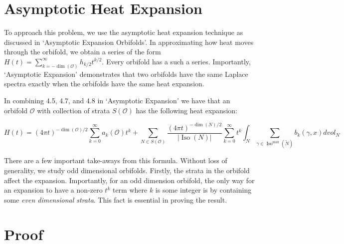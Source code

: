 \documentclass{article}[12pt]
\theoremstyle{definition}
\newcommand{\myabs}[1]{\vert#1\vert}
\newcommand{\orb}{\mathcal{O}}
\DeclareMathOperator{\iso}{Iso}
\begin{document}

\section{Asymptotic Heat Expansion}
To approach this problem, we use the asymptotic heat expansion technique as
discussed in `Asymptotic Expansion Orbifolds'\cite{DGGW}. In approximating
how heat moves through the orbifold, we obtain
a series of the form $H(t) = \sum_{k=-\dim(\orb)}^{\infty} h_{k/2}
t^{k/2}$. Every orbifold has a such a series. 
Importantly, `Asymptotic Expansion' demonstrates that two orbifolds
have the same Laplace spectra exactly when the orbifolds have the same heat
expansion.

In combining 4.5, 4.7, and 4.8 in `Asymptotic Expansion' we have
that an orbifold $\orb$ with collection of strata $S(\orb)$ has the
following heat expansion:

\begin{equation}
    H(t) = {(4\pi t)}^{-\dim(\mathcal{O})/2}\sum_{k=0}^{\infty}a_k(\mathcal{O})t^k
            +\sum_{N \in S(\mathcal{O})}\frac{{(4\pi t)}^{-\dim(N)/2}}{\myabs{\iso(N)}}\sum_{k=0}^{\infty}t^k\int_{N} \sum_{\gamma \in \iso^{\max}(\widetilde{N})}b_k(\gamma,x) dvol_N
            \label{eq:H(t)}
\end{equation}

There are a few important take-aways from this formula. 
Without loss of generality, we study odd dimensional orbifolds.
Firstly, the strata in the orbifold affect the expansion.  Importantly, for
an odd dimension orbifold, the only way for an expansion to have a non-zero
$t^{k}$ term where $k$ is some integer is by containing some \emph{even
dimensional strata}. This fact is essential in proving the result.

\section{Proof}
\end{document}

